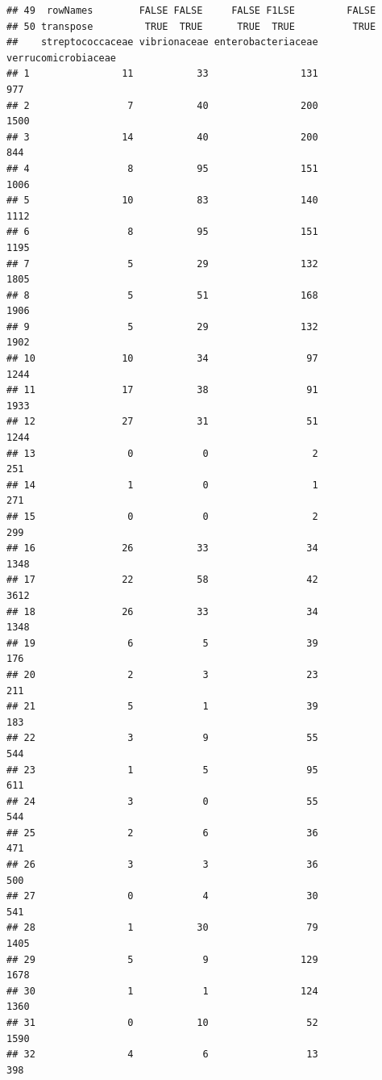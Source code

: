 \documentclass[10pt,handout,english]{beamer}\usepackage[]{graphicx}\usepackage[]{color}
\makeatletter
\newenvironment{kframe}{%
 \def\at@end@of@kframe{}%
 \ifinner\ifhmode%
  \def\at@end@of@kframe{\end{minipage}}%
  \begin{minipage}{\columnwidth}%
 \fi\fi%
 \def\FrameCommand##1{\hskip\@totalleftmargin \hskip-\fboxsep
 \colorbox{shadecolor}{##1}\hskip-\fboxsep
     \hskip-\linewidth \hskip-\@totalleftmargin \hskip\columnwidth}%
 \MakeFramed {\advance\hsize-\width
   \@totalleftmargin\z@ \linewidth\hsize
   \@setminipage}}%
 {\par\unskip\endMakeFramed%
 \at@end@of@kframe}
\newenvironment{knitrout}{}{} %
\makeatother
\begin{document}
\begin{frame}[fragile]
\begin{knitrout}
\begin{kframe}
\begin{verbatim}
## 49  rowNames        FALSE FALSE     FALSE F1LSE         FALSE
## 50 transpose         TRUE  TRUE      TRUE  TRUE          TRUE
##    streptococcaceae vibrionaceae enterobacteriaceae verrucomicrobiaceae
## 1                11           33                131                 977
## 2                 7           40                200                1500
## 3                14           40                200                 844
## 4                 8           95                151                1006
## 5                10           83                140                1112
## 6                 8           95                151                1195
## 7                 5           29                132                1805
## 8                 5           51                168                1906
## 9                 5           29                132                1902
## 10               10           34                 97                1244
## 11               17           38                 91                1933
## 12               27           31                 51                1244
## 13                0            0                  2                 251
## 14                1            0                  1                 271
## 15                0            0                  2                 299
## 16               26           33                 34                1348
## 17               22           58                 42                3612
## 18               26           33                 34                1348
## 19                6            5                 39                 176
## 20                2            3                 23                 211
## 21                5            1                 39                 183
## 22                3            9                 55                 544
## 23                1            5                 95                 611
## 24                3            0                 55                 544
## 25                2            6                 36                 471
## 26                3            3                 36                 500
## 27                0            4                 30                 541
## 28                1           30                 79                1405
## 29                5            9                129                1678
## 30                1            1                124                1360
## 31                0           10                 52                1590
## 32                4            6                 13                 398

\end{verbatim}
\end{kframe}
\end{knitrout}
\end{frame}
\end{document}
